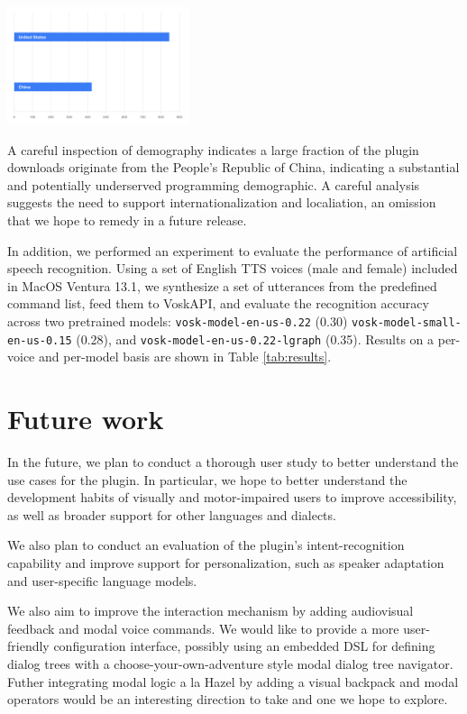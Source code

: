 \documentclass[conference]{IEEEtran}
\begin{document}
\begin{center}\includegraphics[width=0.40\textwidth]{demographics.png}\end{center}

A careful inspection of demography indicates a large fraction of the plugin downloads originate from the People's Republic of China, indicating a substantial and potentially underserved programming demographic. A careful analysis suggests the need to support internationalization and localiation, an omission that we hope to remedy in a future release.

In addition, we performed an experiment to evaluate the performance of artificial speech recognition. Using a set of English TTS voices (male and female) included in MacOS Ventura 13.1, we synthesize a set of utterances from the predefined command list, feed them to VoskAPI, and evaluate the recognition accuracy across two pretrained models: \texttt{vosk-model-en-us-0.22} (0.30) \texttt{vosk-model-small-en-us-0.15} (0.28), and \texttt{vosk-model-en-us-0.22-lgraph} (0.35). Results on a per-voice and per-model basis are shown in Table \ref{tab:results}.

\section{Future work}

In the future, we plan to conduct a thorough user study to better understand the use cases for the plugin. In particular, we hope to better understand the development habits of visually and motor-impaired users to improve accessibility, as well as broader support for other languages and dialects.

We also plan to conduct an evaluation of the plugin's intent-recognition capability and improve support for personalization, such as speaker adaptation and user-specific language models.

We also aim to improve the interaction mechanism by adding audiovisual feedback and modal voice commands. We would like to provide a more user-friendly configuration interface, possibly using an embedded DSL for defining dialog trees with a choose-your-own-adventure style modal dialog tree navigator. Futher integrating modal logic a la Hazel by adding a visual backpack and modal operators would be an interesting direction to take and one we hope to explore.
\end{document}
